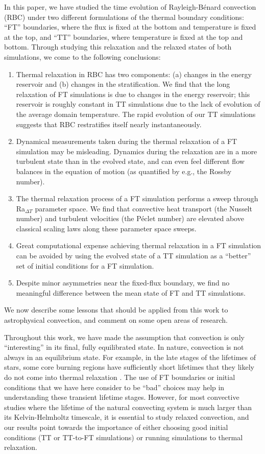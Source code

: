 \documentclass[aps, pre, onecolumn, nofootinbib, notitlepage, groupedaddress, amsfonts, amssymb, amsmath, longbibliography, superscriptaddress]{revtex4-1}
\newcommand{\RB}{Rayleigh-B\'{e}nard }
\begin{document}
In this paper, we have studied the time evolution of \RB convection (RBC) under two different formulations of the thermal boundary conditions: ``FT'' boundaries, where the flux is fixed at the bottom and temperature is fixed at the top, and ``TT'' boundaries, where temperature is fixed at the top and bottom.
Through studying this relaxation and the relaxed states of both simulations, we come to the following conclusions:
\begin{enumerate}
\item Thermal relaxation in RBC has two components: (a) changes in the energy reservoir and (b) changes in the stratification.
We find that the long relaxation of FT simulations is due to changes in the energy reservoir; this reservoir is roughly constant in TT simulations due to the lack of evolution of the average domain temperature.
The rapid evolution of our TT simulations suggests that RBC restratifies itself nearly instantaneously.
\item Dynamical measurements taken during the thermal relaxation of a FT simulation may be misleading.
Dynamics during the relaxation are in a more turbulent state than in the evolved state, and can even feel different flow balances in the equation of motion (as quantified by e.g., the Rossby number).
\item The thermal relaxation process of a FT simulation performs a sweep through Ra$_{\Delta T}$ parameter space.
We find that convective heat transport (the Nusselt number) and turbulent velocities (the P\'{e}clet number) are elevated above classical scaling laws along these parameter space sweeps.
\item Great computational expense achieving thermal relaxation in a FT simulation can be avoided by using the evolved state of a TT simulation as a ``better'' set of initial conditions for a FT simulation.
\item Despite minor asymmetries near the fixed-flux boundary, we find no meaningful difference between the mean state of FT and TT simulations.
\end{enumerate}
We now describe some lessons that should be applied from this work to astrophysical convection, and comment on some open areas of research.

Throughout this work, we have made the assumption that convection is only ``interesting'' in its final, fully equilibrated state.
In nature, convection is not always in an equilibrium state.
For example, in the late stages of the lifetimes of stars, some core burning regions have sufficiently short lifetimes that they likely do not come into thermal relaxation \citep{clarkson&all2018, andrassy&all2020}.
The use of FT boundaries or initial conditions that we have here consider to be ``bad'' choices may help in understanding these transient lifetime stages.
However, for most convective studies where the lifetime of the natural convecting system is much larger than its Kelvin-Helmholtz timescale, it is essential to study relaxed convection, and our results point towards the importance of either choosing good initial conditions (TT or TT-to-FT simulations) or running simulations to thermal relaxation.
\end{document}
